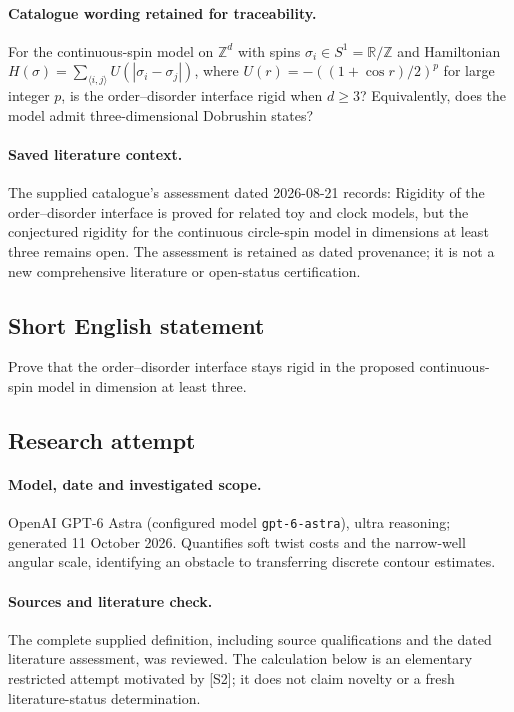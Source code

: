 \documentclass[11pt]{article}
\begin{document}
\paragraph{Catalogue wording retained for traceability.}
For the continuous-spin model on $\mathbb Z^d$ with spins $\sigma_i\in S^1=\mathbb R/\mathbb Z$ and Hamiltonian $H(\sigma)=\sum_{\langle i,j\rangle}U(|\sigma_i-\sigma_j|)$, where $U(r)=-((1+\cos r)/2)^p$ for large integer $p$, is the order–disorder interface rigid when $d\geq3$? Equivalently, does the model admit three-dimensional Dobrushin states?

\paragraph{Saved literature context.} The supplied catalogue's assessment dated 2026-08-21 records: Rigidity of the order--disorder interface is proved for related toy and clock models, but the conjectured rigidity for the continuous circle-spin model in dimensions at least three remains open. The assessment is retained as dated provenance; it is not a new comprehensive literature or open-status certification.
\subsection{Short English statement}
Prove that the order--disorder interface stays rigid in the proposed continuous-spin model in dimension at least three.
\subsection{Research attempt}
\paragraph{Model, date and investigated scope.}
OpenAI GPT-6 Astra (configured model \texttt{gpt-6-astra}), ultra reasoning; generated 11 October 2026. Quantifies soft twist costs and the narrow-well angular scale, identifying an obstacle to transferring discrete contour estimates.

\paragraph{Sources and literature check.}
The complete supplied definition, including source qualifications and the dated literature assessment, was reviewed. The calculation below is an elementary restricted attempt motivated by [S2]; it does not claim novelty or a fresh literature-status determination.
\end{document}
